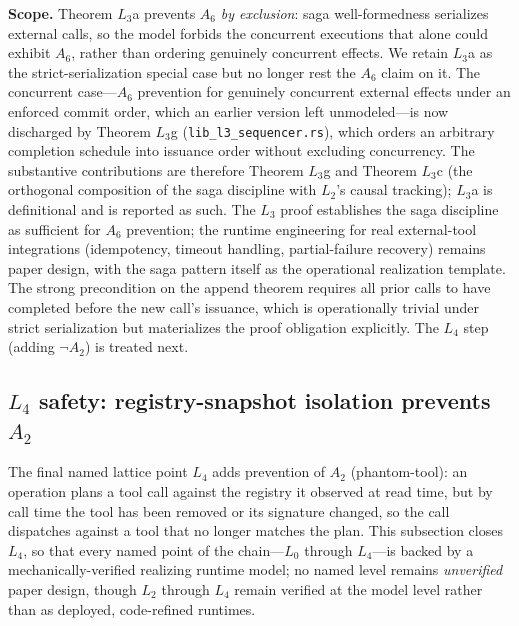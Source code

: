 \documentclass[journal,compsoc,10pt]{IEEEtran}
\providecommand{\citep}{\cite}
\theoremstyle{definition}
\theoremstyle{remark}
\begin{document}
\medskip
\noindent\textbf{Scope.}
Theorem $L_3$a prevents $A_6$ \emph{by exclusion}: saga well-formedness
serializes external calls, so the model forbids the concurrent executions that
alone could exhibit $A_6$, rather than ordering genuinely concurrent effects.
We retain $L_3$a as the strict-serialization special case but no longer rest
the $A_6$ claim on it. The concurrent case---$A_6$ prevention for genuinely
concurrent external effects under an enforced commit order, which an earlier
version left unmodeled---is now discharged by Theorem $L_3$g
(\texttt{lib\_l3\_sequencer.rs}), which orders an arbitrary completion schedule
into issuance order without excluding concurrency. The substantive
contributions are therefore Theorem $L_3$g and Theorem $L_3$c (the orthogonal
composition of the saga discipline with $L_2$'s causal tracking); $L_3$a is
definitional and is reported as such.
The $L_3$ proof establishes the saga discipline as sufficient
for $A_6$ prevention; the runtime engineering for real
external-tool integrations (idempotency, timeout handling,
partial-failure recovery) remains paper design, with the
saga pattern itself \citep{GarciaMolinaSalem1987Sagas,
MohammadiEtAl2026Atomix} as the operational realization
template. The strong precondition on the append theorem
requires all prior calls to have completed before the new
call's issuance, which is operationally trivial under strict
serialization but materializes the proof obligation
explicitly. The $L_4$ step (adding $\neg A_2$) is treated
next.

\subsection{$L_4$ safety: registry-snapshot isolation prevents $A_2$}
\label{sec:l4-safety}

The final named lattice point $L_4$ adds prevention of $A_2$
(phantom-tool): an operation plans a tool call against the
registry it observed at read time, but by call time the tool
has been removed or its signature changed, so the call
dispatches against a tool that no longer matches the plan.
This subsection closes $L_4$, so that every named point of the
chain---$L_0$ through $L_4$---is backed by a
mechanically-verified realizing runtime model; no named level remains
\emph{unverified} paper design, though $L_2$ through $L_4$ remain verified
at the model level rather than as deployed, code-refined runtimes.
\end{document}

